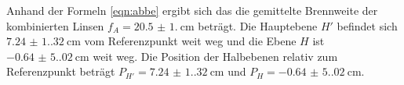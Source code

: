 Anhand der Formeln \ref{eqn:abbe} ergibt sich das die gemittelte Brennweite der kombinierten Linsen $f_A=\qty{20.5(1.0)}{\centi\meter}$ beträgt. Die Hauptebene $H'$ befindet sich $\qty{7.24(1.32)}{\centi\meter}$ vom Referenzpunkt
weit weg und die Ebene $H$ ist $\qty{-0.64(5.02)}{\centi\meter}$ weit weg.
Die Position der Halbebenen relativ zum Referenzpunkt beträgt $P_{H'}=\qty{7.24(1.32)}{\centi\meter}$  und $P_H=\qty{-0.64(5.02)}{\centi\meter}$.
